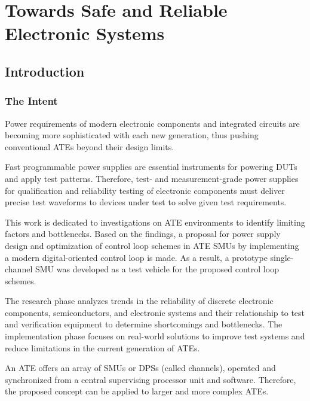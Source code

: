 

\chapter{Towards Safe and Reliable Electronic Systems}
\label{ch:towards-safe-reliable-systems}



\section{Introduction}
\label{sec:ch1-introduction}

\subsection{The Intent}
\label{subsec:theintent}

Power requirements of modern electronic components and integrated circuits are
becoming more sophisticated with each new generation, thus pushing conventional
\acp{ATE} beyond their design limits.

Fast programmable power supplies are essential instruments for powering \acp{DUT}
and apply test patterns.
Therefore, test- and measurement-grade power supplies for qualification and
reliability testing of electronic components must deliver precise test waveforms
to devices under test to solve given test requirements.

This work is dedicated to investigations on \ac{ATE}
environments to identify limiting factors and bottlenecks.
Based on the findings, a proposal for power supply design and optimization of
control loop schemes in ATE \acp{SMU} by implementing a modern digital-oriented
control loop is made.
As a result, a prototype single-channel \ac{SMU} was developed as a test vehicle
for the proposed control loop schemes.

The research phase analyzes trends in the reliability of discrete electronic
components, semiconductors, and electronic systems and their relationship to
test and verification equipment to determine shortcomings and bottlenecks.
The implementation phase focuses on real-world solutions to improve test systems
and reduce limitations in the current generation of \acp{ATE}.

An \ac{ATE} offers an array of \acp{SMU} or \acp{DPS} (called channels),
operated and synchronized from a central supervising processor unit and
software.
Therefore, the proposed concept can be applied to larger and more
complex \acp{ATE}.


